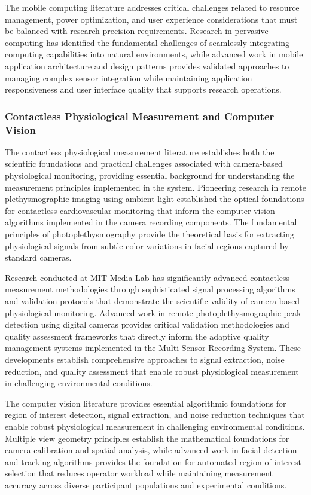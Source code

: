 \documentclass[11pt,a4paper]{report}
\begin{document}
The mobile computing literature addresses critical challenges related to resource management, power optimization, and
user experience considerations that must be balanced with research precision requirements. Research in pervasive
computing has identified the fundamental challenges of seamlessly integrating computing capabilities into natural
environments, while advanced work in mobile application architecture and design patterns provides validated approaches
to managing complex sensor integration while maintaining application responsiveness and user interface quality that
supports research operations.

\subsubsection{Contactless Physiological Measurement and Computer Vision}

The contactless physiological measurement literature establishes both the scientific foundations and practical
challenges associated with camera-based physiological monitoring, providing essential background for understanding the
measurement principles implemented in the system. Pioneering research in remote plethysmographic imaging using ambient
light established the optical foundations for contactless cardiovascular monitoring that inform the computer vision
algorithms implemented in the camera recording components. The fundamental principles of photoplethysmography provide
the theoretical basis for extracting physiological signals from subtle color variations in facial regions captured by
standard cameras.

Research conducted at MIT Media Lab has significantly advanced contactless measurement methodologies through
sophisticated signal processing algorithms and validation protocols that demonstrate the scientific validity of
camera-based physiological monitoring. Advanced work in remote photoplethysmographic peak detection using digital
cameras provides critical validation methodologies and quality assessment frameworks that directly inform the adaptive
quality management systems implemented in the Multi-Sensor Recording System. These developments establish comprehensive
approaches to signal extraction, noise reduction, and quality assessment that enable robust physiological measurement in
challenging environmental conditions.

The computer vision literature provides essential algorithmic foundations for region of interest detection, signal
extraction, and noise reduction techniques that enable robust physiological measurement in challenging environmental
conditions. Multiple view geometry principles establish the mathematical foundations for camera calibration and spatial
analysis, while advanced work in facial detection and tracking algorithms provides the foundation for automated region
of interest selection that reduces operator workload while maintaining measurement accuracy across diverse participant
populations and experimental conditions.
\end{document}

